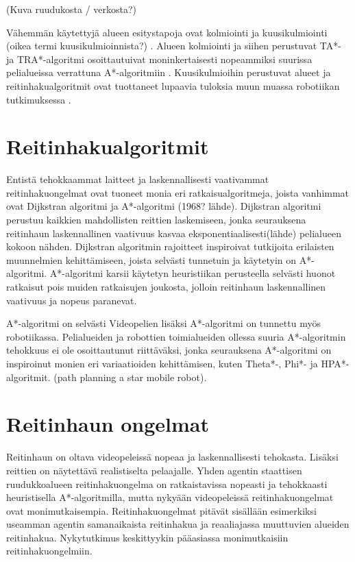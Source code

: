 \documentclass[utf8]{gradu3}
\begin{document}
(Kuva ruudukosta / verkosta?)

Vähemmän käytettyjä alueen esitystapoja ovat kolmiointi ja kuusikulmiointi (oikea termi kuusikulmioinnista?) \parencite{abd2015comprehensive}. Alueen kolmiointi ja siihen perustuvat TA*- ja TRA*-algoritmi osoittautuivat moninkertaisesti nopeammiksi suurissa pelialueissa verrattuna A*-algoritmiin \parencite{demyen2006efficient}. Kuusikulmioihin perustuvat alueet ja reitinhakualgoritmit ovat tuottaneet lupaavia tuloksia muun muassa robotiikan tutkimuksessa \parencite{abd2015comprehensive}.

\section{Reitinhakualgoritmit}

Entistä tehokkaammat laitteet ja laskennallisesti vaativammat reitinhakuongelmat ovat tuoneet monia eri ratkaisualgoritmeja, joista vanhimmat ovat Dijkstran algoritmi ja A*-algoritmi (1968? lähde). Dijkstran algoritmi perustuu kaikkien mahdollisten reittien laskemiseen, jonka seurauksena reitinhaun laskennallinen vaativuus kasvaa eksponentiaalisesti(lähde) pelialueen kokoon nähden. Dijkstran algoritmin rajoitteet inspiroivat tutkijoita erilaisten muunnelmien kehittämiseen, joista selvästi tunnetuin ja käytetyin on A*-algoritmi. A*-algoritmi karsii käytetyn heuristiikan perusteella selvästi huonot ratkaisut pois muiden ratkaisujen joukosta, jolloin reitinhaun laskennallinen vaativuus ja nopeus paranevat.

A*-algoritmi on selvästi  Videopelien lisäksi A*-algoritmi on tunnettu myös robotiikassa. Pelialueiden ja robottien toimialueiden ollessa suuria A*-algoritmin tehokkuus ei ole osoittautunut riittäväksi, jonka seurauksena A*-algoritmi on inspiroinut monien eri variaatioiden kehittämisen, kuten Theta*-, Phi*- ja HPA*-algoritmit. (path planning a star mobile robot).

\section{Reitinhaun ongelmat}

Reitinhaun on oltava videopeleissä nopeaa ja laskennallisesti tehokasta. Lisäksi reittien on näytettävä realistiselta pelaajalle. Yhden agentin staattisen ruudukkoalueen reitinhakuongelma on ratkaistavissa nopeasti ja tehokkaasti heuristisella A*-algoritmilla, mutta nykyään videopeleissä reitinhakuongelmat ovat monimutkaisempia. Reitinhakuongelmat pitävät sisällään esimerkiksi useamman agentin samanaikaista reitinhakua ja reaaliajassa muuttuvien alueiden reitinhakua. Nykytutkimus keskittyykin pääasiassa monimutkaisiin reitinhakuongelmiin.
\end{document}
